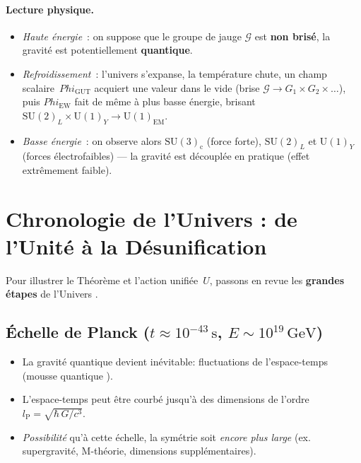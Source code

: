 \documentclass[12pt]{article}
\def\Phi{Phi}%
\begin{document}
\paragraph{Lecture physique.}
\begin{itemize}
    \item \emph{Haute \'energie}~: on suppose que le groupe de jauge \(\mathcal{G}\) 
    est \textbf{non bris\'e}, la gravit\'e est potentiellement \textbf{quantique}.  
    \item \emph{Refroidissement}~: l'univers s'expanse, la temp\'erature chute, 
    un champ scalaire \(\,\Phi_\text{GUT}\) acquiert une valeur dans le vide 
    (brise \(\mathcal{G}\to G_1\times G_2 \times\dots\)), 
    puis \(\Phi_{\text{EW}}\) fait de m\^eme \`a plus basse \'energie, 
    brisant \(\mathrm{SU}(2)_L\times\mathrm{U}(1)_Y \to \mathrm{U}(1)_{\text{EM}}\).  
    \item \emph{Basse \'energie}~: on observe alors \(\mathrm{SU}(3)_\mathrm{c}\) (force forte), 
    \(\mathrm{SU}(2)_L\) et \(\mathrm{U}(1)_Y\) (for\-ces \'electrofaibles) 
    --- la gravit\'e est d\'ecoupl\'ee en pratique (effet extr\^emement faible).
\end{itemize}

\section{Chronologie de l'Univers : de l'Unit\'e \`a la D\'esunification}
\label{sec:chronologie}

Pour illustrer le \og Th\'eor\`eme \fg{} et l'action unifi\'ee \(\,U\), passons 
en revue les \textbf{grandes \'etapes} de l'Univers \cite{kolbturner, riess1998, planck2018}.

\subsection{\'Echelle de Planck (\(t \approx 10^{-43}\,\mathrm{s}\), \(E \sim 10^{19}\,\mathrm{GeV}\))}

\begin{itemize}
    \item La gravit\'e quantique devient in\'evitable: 
    fluctuations de l'espace-temps (\og mousse quantique \fg).  
    \item L'espace-temps peut \^etre courb\'e jusqu'\`a des dimensions de l'ordre 
          \(l_\mathrm{P} = \sqrt{\hbar\,G/c^3}\).  
    \item \emph{Possibilit\'e} qu'\`a cette \'echelle, la sym\'etrie soit \emph{encore plus large} 
          (ex. supergravité, M-th\'eorie, dimensions suppl\'ementaires).
\end{itemize}
\end{document}
